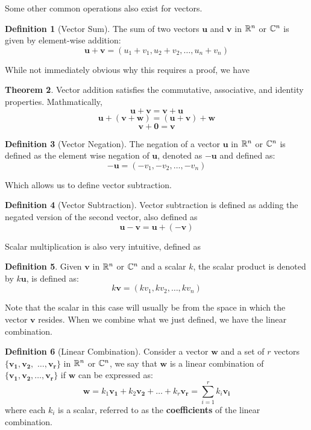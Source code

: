 \documentclass[12pt]{article}
\theoremstyle{definition}
\newtheorem{theorem}{Theorem}[section]
\newtheorem{definition}[theorem]{Definition}
\begin{document}
Some other common operations also exist for vectors.

\begin{definition}[Vector Sum]
    The sum of two vectors $\mathbf{u}$ and $\mathbf{v}$ in $\mathbb{R}^n$ or $\mathbb{C}^n$ is given by element-wise addition:
    $$\mathbf{u} + \mathbf{v} = (u_1 + v_1, u_2 + v_2, \ldots, u_n + v_n)$$
\end{definition}

While not immediately obvious why this requires a proof, we have 

\begin{theorem}
    Vector addition satisfies the commutative, associative, and identity properties. Mathmatically,
    $$\mathbf{u} + \mathbf{v} = \mathbf{v} + \mathbf{u}$$
    $$\mathbf{u} + (\mathbf{v} + \mathbf{w}) = (\mathbf{u} + \mathbf{v}) + \mathbf{w}$$
    $$\mathbf{v} + \mathbf{0} = \mathbf{v}$$
\end{theorem}


\begin{definition}[Vector Negation]
    The negation of a vector $\mathbf{u}$ in $\mathbb{R}^n$ or $\mathbb{C}^n$ is defined as the element wise negation of $\mathbf{u}$, denoted as $-\mathbf{u}$ and defined as:
    $$-\mathbf{u} = (-v_1, -v_2, \ldots, -v_n)$$
\end{definition}

Which allows us to define vector subtraction. 

\begin{definition}[Vector Subtraction]
    Vector subtraction is defined as adding the negated version of the second vector, also defined as $$\mathbf{u} - \mathbf{v} = \mathbf{u}+ (-\mathbf{v})$$
\end{definition}

Scalar multiplication is also very intuitive, defined as

\begin{definition}
    Given $\mathbf{v}$ in $\mathbb{R}^n$ or $\mathbb{C}^n$ and a scalar $k$, the scalar product is denoted by $k\mathbf{u}$, is defined as:
    $$k\mathbf{v} = (k v_1, k v_2, \ldots, k v_n)$$
\end{definition}

Note that the scalar in this case will usually be from the space in which the vector $\mathbf{v}$ resides. When we combine what we just defined, we have the linear combination. 

\begin{definition}[Linear Combination]
    Consider a vector $\mathbf{w}$ and a set of $r$ vectors $\{\mathbf{v_1}, \mathbf{v_2},$ $ \ldots, \mathbf{v_r}\}$ in $\mathbb{R}^n$ or $\mathbb{C}^n$, we say that $\mathbf{w}$ is a linear combination of $\{\mathbf{v_1}, \mathbf{v_2}, \ldots, \mathbf{v_r}\}$ if $\mathbf{w}$ can be expressed as:
    $$\mathbf{w} = k_1 \mathbf{v_1} + k_2 \mathbf{v_2} + \ldots + k_r \mathbf{v_r} = \sum_{i = 1}^{r} k_i \mathbf{v_i}$$ 
    where each $k_i$ is a scalar, referred to as the \textbf{coefficients} of the linear combination.
\end{definition}
\end{document}
